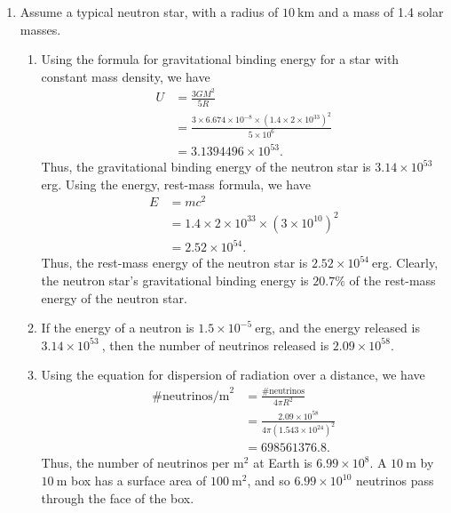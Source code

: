 \documentclass[a4paper,11pt]{article}
\newcommand{\ds}{\displaystyle}
\begin{document}
{{\begin{enumerate}[leftmargin=*]
\begin{enumerate}[label=\alph*)]
\begin{align*}
									 & = 5.555555556\times 10^{18}.
					\end{align*}
					Thus, the mass accretion rate onto Cygnus X-1 is $\ds{5.56 \times 10^{18}\:}$g/sec, which is $\ds{8.6\times 10^{-8}\:\text{M}_{\odot}}$/year.
			\end{enumerate}
			\pagebreak
		\item Assume a typical neutron star, with a radius of $\ds{10\:}$km and a mass of 1.4 solar masses.
			\begin{enumerate}[label=\alph*)]
				\item Using the formula for gravitational binding energy for a star with constant mass density, we have
					\begin{align*}
						U & = \frac{3GM^2}{5R} \\
						  & = \frac{3\times 6.674\times 10^{-8}\times \left(1.4\times 2\times 10^{33} \right)^2}{5\times 10^6} \\
						  & = 3.1394496 \times 10^{53}.
					\end{align*}
					Thus, the gravitational binding energy of the neutron star is $\ds{3.14 \times 10^{53}\:}$erg. Using the energy, rest-mass formula, we have
					\begin{align*}
						E & = mc^2 \\
						  & = 1.4\times 2\times 10^{33} \times \left(3\times 10^{10}\right)^2 \\
						  & = 2.52\times 10^{54}.
					\end{align*}
					Thus, the rest-mass energy of the neutron star is $\ds{2.52\times 10^{54}\:}$erg. Clearly, the neutron star's gravitational binding energy is $\ds{20.7\%}$ of the rest-mass energy of the neutron star.
				\item If the energy of a neutron is $\ds{1.5\times 10^{-5}\:}$erg, and the energy released is $\ds{3.14\times 10^{53}\:}$, then the number of neutrinos released is $\ds{2.09\times 10^{58}}$.
				\item Using the equation for dispersion of radiation over a distance, we have 
					\begin{align*}
						\text{\# neutrinos/m}^2 & = \frac{\text{\# neutrinos}}{4\pi R^2} \\
												& = \frac{2.09\times 10^{58}}{4\pi \left(1.543\times 10^24 \right)^2} \\
												& = 698561376.8.
					\end{align*}
					Thus, the number of neutrinos per $\ds{\text{m}^2}$ at Earth is $\ds{6.99 \times 10^8}$. A $\ds{10\:}$m by $\ds{10\:}$m box has a surface area of $\ds{100\:\text{m}^2}$, and so $\ds{6.99 \times 10^{10}}$ neutrinos pass through the face of the box.

\end{enumerate}
\end{enumerate}}}
\end{document}
